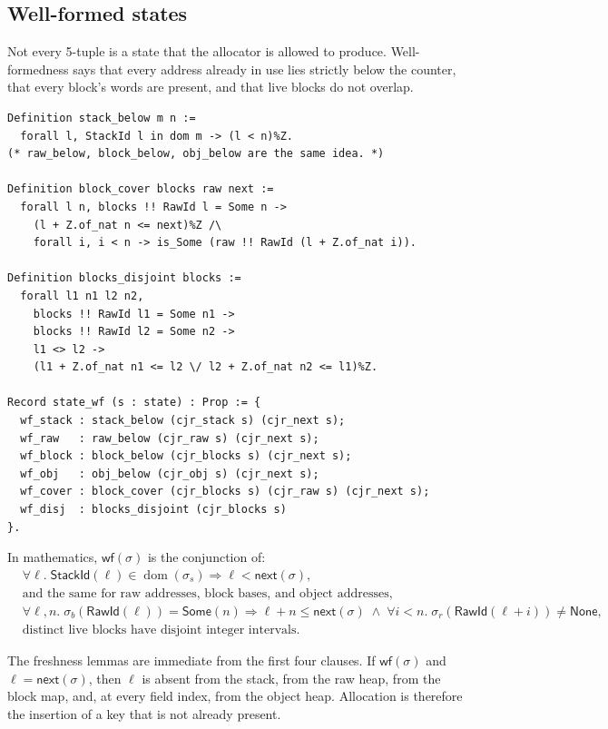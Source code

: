 \documentclass[11pt]{article}
\newcommand{\WF}{\mathsf{wf}}
\newcommand{\dom}{\operatorname{dom}}
\newcommand{\lookup}[2]{#1(#2)}
\newcommand{\None}{\mathsf{None}}
\newcommand{\Some}{\mathsf{Some}}
\begin{document}
\subsection{Well-formed states}

Not every 5-tuple is a state that the allocator is allowed to produce.
Well-formedness says that every address already in use lies strictly below the counter, that every block's words are present, and that live blocks do not overlap.

\begin{lstlisting}
Definition stack_below m n :=
  forall l, StackId l in dom m -> (l < n)%Z.
(* raw_below, block_below, obj_below are the same idea. *)

Definition block_cover blocks raw next :=
  forall l n, blocks !! RawId l = Some n ->
    (l + Z.of_nat n <= next)%Z /\
    forall i, i < n -> is_Some (raw !! RawId (l + Z.of_nat i)).

Definition blocks_disjoint blocks :=
  forall l1 n1 l2 n2,
    blocks !! RawId l1 = Some n1 ->
    blocks !! RawId l2 = Some n2 ->
    l1 <> l2 ->
    (l1 + Z.of_nat n1 <= l2 \/ l2 + Z.of_nat n2 <= l1)%Z.

Record state_wf (s : state) : Prop := {
  wf_stack : stack_below (cjr_stack s) (cjr_next s);
  wf_raw   : raw_below (cjr_raw s) (cjr_next s);
  wf_block : block_below (cjr_blocks s) (cjr_next s);
  wf_obj   : obj_below (cjr_obj s) (cjr_next s);
  wf_cover : block_cover (cjr_blocks s) (cjr_raw s) (cjr_next s);
  wf_disj  : blocks_disjoint (cjr_blocks s)
}.
\end{lstlisting}

In mathematics, \(\WF(\sigma)\) is the conjunction of:
\begin{align*}
&\forall \ell.\; \mathsf{StackId}(\ell)\in\dom(\sigma_{s}) \Rightarrow \ell < \mathsf{next}(\sigma),\\
&\text{and the same for raw addresses, block bases, and object addresses,}\\
&\forall \ell,n.\;
  \lookup{\sigma_{b}}{\mathsf{RawId}(\ell)}=\Some(n)
  \Rightarrow
  \ell+n \le \mathsf{next}(\sigma)
  \;\wedge\;
  \forall i<n.\;
  \lookup{\sigma_{r}}{\mathsf{RawId}(\ell+i)}\neq\None,\\
&\text{distinct live blocks have disjoint integer intervals.}
\end{align*}

The freshness lemmas are immediate from the first four clauses.
If \(\WF(\sigma)\) and \(\ell=\mathsf{next}(\sigma)\), then \(\ell\) is absent from the stack, from the raw heap, from the block map, and, at every field index, from the object heap.
Allocation is therefore the insertion of a key that is not already present.
\end{document}
